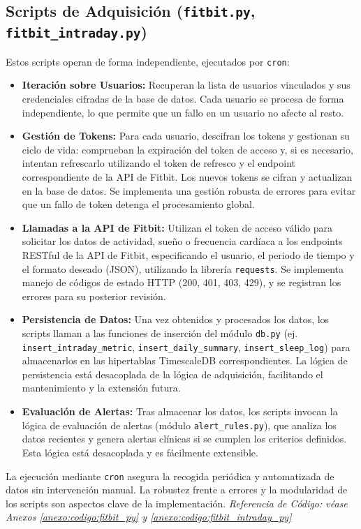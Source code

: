 \subsection{Scripts de Adquisición (\texttt{fitbit.py}, \texttt{fitbit\_intraday.py})}
Estos scripts operan de forma independiente, ejecutados por \texttt{cron}:
\begin{itemize}
    \item \textbf{Iteración sobre Usuarios:} Recuperan la lista de usuarios vinculados y sus credenciales cifradas de la base de datos. Cada usuario se procesa de forma independiente, lo que permite que un fallo en un usuario no afecte al resto.
    \item \textbf{Gestión de Tokens:} Para cada usuario, descifran los tokens y gestionan su ciclo de vida: comprueban la expiración del token de acceso y, si es necesario, intentan refrescarlo utilizando el token de refresco y el endpoint correspondiente de la API de Fitbit. Los nuevos tokens se cifran y actualizan en la base de datos. Se implementa una gestión robusta de errores para evitar que un fallo de token detenga el procesamiento global.
    \item \textbf{Llamadas a la API de Fitbit:} Utilizan el token de acceso válido para solicitar los datos de actividad, sueño o frecuencia cardíaca a los endpoints RESTful de la API de Fitbit, especificando el usuario, el periodo de tiempo y el formato deseado (JSON), utilizando la librería \texttt{requests}. Se implementa manejo de códigos de estado HTTP (200, 401, 403, 429), y se registran los errores para su posterior revisión.
    \item \textbf{Persistencia de Datos:} Una vez obtenidos y procesados los datos, los scripts llaman a las funciones de inserción del módulo \texttt{db.py} (ej. \texttt{insert\_intraday\_metric}, \texttt{insert\_daily\_summary}, \texttt{insert\_sleep\_log}) para almacenarlos en las hipertablas TimescaleDB correspondientes. La lógica de persistencia está desacoplada de la lógica de adquisición, facilitando el mantenimiento y la extensión futura.
    \item \textbf{Evaluación de Alertas:} Tras almacenar los datos, los scripts invocan la lógica de evaluación de alertas (módulo \texttt{alert\_rules.py}), que analiza los datos recientes y genera alertas clínicas si se cumplen los criterios definidos. Esta lógica está desacoplada y es fácilmente extensible.
\end{itemize}
La ejecución mediante \texttt{cron} asegura la recogida periódica y automatizada de datos sin intervención manual. La robustez frente a errores y la modularidad de los scripts son aspectos clave de la implementación.
\noindent\textit{Referencia de Código: véase Anexos \ref{anexo:codigo:fitbit_py} y \ref{anexo:codigo:fitbit_intraday_py}}

